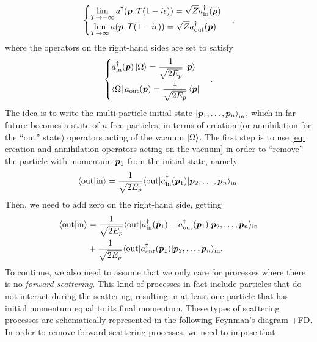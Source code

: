 \begin{equation}
\label{eq: far past and far future creation and annihilation operators}
    \begin{cases}
        \displaystyle\lim_{T \to -\infty}a^\dagger(\bm{p},T(1 - i\epsilon)) = \sqrt{Z}a^\dagger_{\mathrm{in}}(\bm{p}) \\
        \displaystyle\lim_{T \to \infty}a(\bm{p},T(1 - i\epsilon)) = \sqrt{Z}a^\dagger_{\mathrm{out}}(\bm{p})
    \end{cases},
\end{equation}
where the operators on the right-hand sides are set to satisfy 
\begin{equation}
\label{eq: creation and annihilation operators acting on the vacuum}
    \begin{cases}
        a^\dagger_{\mathrm{in}}(\bm{p})\ket{\Omega} = \dfrac{1}{\sqrt{2E_p}}\ket{\bm{p}} \\[2ex]
        \bra{\Omega} a_{\mathrm{out}}(\bm{p}) = \dfrac{1}{\sqrt{2E_p}}\bra{\bm{p}}
    \end{cases}.
\end{equation}
The idea is to write the multi-particle initial state $\ket{\bm{p}_1,\dots,\bm{p}_n}_{\mathrm{in}}$, which in far future becomes a state of $n$ free particles, in terms of creation (or annihilation for the ``out'' state) operators acting of the vacuum $\ket{\Omega}$. The first step is to use \eqref{eq: creation and annihilation operators acting on the vacuum} in order to ``remove'' the particle with momentum $\bm{p}_1$ from the initial state, namely 
\begin{equation}
    \langle \mathrm{out} | \mathrm{in} \rangle = \frac{1}{\sqrt{2E_p}}\langle \mathrm{out} | a^\dagger_{\mathrm{in}}(\bm{p}_1) | \bm{p}_2,\dots,\bm{p}_n \rangle_{\mathrm{in}}.
\end{equation}
Then, we need to add zero on the right-hand side, getting 
\begin{equation}
    \begin{split}
        \langle \mathrm{out} | \mathrm{in} \rangle &= \frac{1}{\sqrt{2E_p}}\langle \mathrm{out} | a^\dagger_{\mathrm{in}}(\bm{p}_1) - a^\dagger_{\mathrm{out}}(\bm{p}_1) | \bm{p}_2,\dots,\bm{p}_n \rangle_{\mathrm{in}} \\
        &+ \frac{1}{\sqrt{2E_p}}\langle \mathrm{out} | a^\dagger_{\mathrm{out}}(\bm{p}_1) | \bm{p}_2,\dots,\bm{p}_n \rangle_{\mathrm{in}}.
    \end{split}
\end{equation}
To continue, we also need to assume that we only care for processes where there is no \emph{forward scattering}. This kind of processes in fact include particles that do not interact during the scattering, resulting in at least one particle that has initial momentum equal to its final momentum. These types of scattering processes are schematically represented in the following Feynman's diagram +FD. In order to remove forward scattering processes, we need to impose that 
